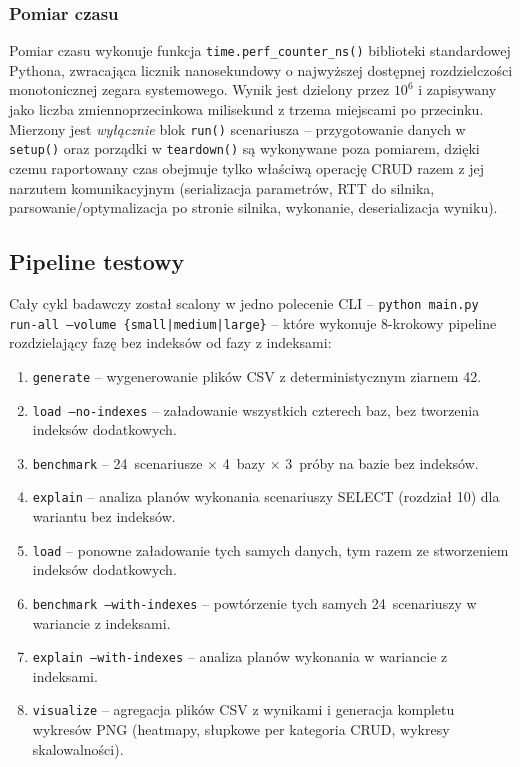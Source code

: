 \subsubsection*{Pomiar czasu}

Pomiar czasu wykonuje funkcja \texttt{time.perf\_counter\_ns()}
biblioteki standardowej Pythona, zwracająca licznik nanosekundowy
o najwyższej dostępnej rozdzielczości monotonicznej zegara systemowego.
Wynik jest dzielony przez \(10^{6}\) i zapisywany jako liczba
zmiennoprzecinkowa milisekund z trzema miejscami po przecinku.
Mierzony jest \emph{wyłącznie} blok \texttt{run()} scenariusza --
przygotowanie danych w \texttt{setup()} oraz porządki w \texttt{teardown()}
są wykonywane poza pomiarem, dzięki czemu raportowany czas obejmuje
tylko właściwą operację CRUD razem z jej narzutem komunikacyjnym
(serializacja parametrów, RTT do silnika, parsowanie/optymalizacja
po stronie silnika, wykonanie, deserializacja wyniku).

\subsection{Pipeline testowy}

Cały cykl badawczy został scalony w jedno polecenie CLI --
\texttt{python main.py run-all --volume \{small|medium|large\}} --
które wykonuje 8-krokowy pipeline rozdzielający fazę bez indeksów
od fazy z indeksami:

\begin{enumerate}
    \item \texttt{generate} -- wygenerowanie plików CSV
    z deterministycznym ziarnem 42.
    \item \texttt{load --no-indexes} -- załadowanie wszystkich czterech
    baz, bez tworzenia indeksów dodatkowych.
    \item \texttt{benchmark} -- 24~scenariusze $\times$ 4~bazy
    $\times$ 3~próby na bazie bez indeksów.
    \item \texttt{explain} -- analiza planów wykonania scenariuszy
    SELECT (rozdział 10) dla wariantu bez indeksów.
    \item \texttt{load} -- ponowne załadowanie tych samych danych,
    tym razem ze stworzeniem indeksów dodatkowych.
    \item \texttt{benchmark --with-indexes} -- powtórzenie tych
    samych 24~scenariuszy w wariancie z indeksami.
    \item \texttt{explain --with-indexes} -- analiza planów
    wykonania w wariancie z indeksami.
    \item \texttt{visualize} -- agregacja plików CSV z wynikami
    i generacja kompletu wykresów PNG (heatmapy, słupkowe per
    kategoria CRUD, wykresy skalowalności).
\end{enumerate}

